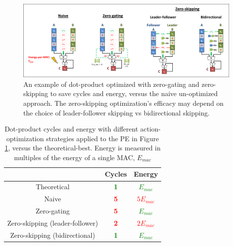 %
%
\begin{figure}[h]
\includegraphics[width=\textwidth]{figures/saf_action_optimizations.PNG}
\caption{An example of dot-product optimized with zero-gating and zero-skipping to save cycles and energy, versus the naive un-optimized approach. The zero-skipping optimization's efficacy may depend on the choice of leader-follower skipping vs bidirectional skipping.}
\label{fig:saf_action_optimizations}
\end{figure}
%
%
\begin{table}[ht]
\begin{tabular}{c|c|c|}
 & Cycles & Energy \\ \hline \hline
Theoretical &  \textcolor{green}{\textbf{1}} & \textcolor{green}{\textbf{$E_{mac}$}}\\ \hline
Naive &  \textcolor{red}{\textbf{5}} & \textcolor{red}{\textbf{$5 E_{mac}$}}\\ \hline
Zero-gating &  \textcolor{red}{\textbf{5}} & \textcolor{green}{\textbf{$E_{mac}$}} \\ \hline
Zero-skipping (leader-follower) & \textcolor{red}{\textbf{2}} & \textcolor{red}{\textbf{$2 E_{mac}$}} \\ \hline
Zero-skipping (bidirectional) & \textcolor{green}{\textbf{1}} & \textcolor{green}{\textbf{$E_{mac}$}} \\ \hline
\end{tabular}
\caption{Dot-product cycles and energy with different action-optimization strategies applied to the PE in Figure \ref{fig:saf_action_optimizations}, versus the theoretical-best. Energy is measured in multiples of the energy of a single MAC, $E_{mac}$}
\label{tab:action_saf_comparison}
\centering
\end{table}
%
%

%


